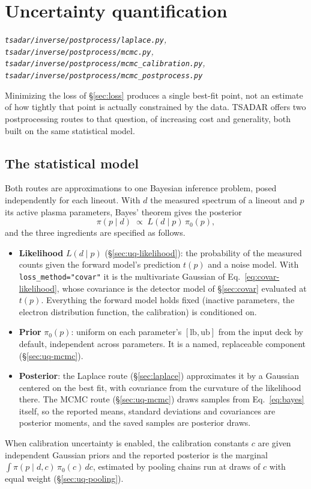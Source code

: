 \documentclass[11pt]{article}
\newcommand{\code}[1]{\texttt{#1}}
\newcommand{\file}[1]{\texttt{#1}}
\begin{document}
\section{Uncertainty quantification}\label{sec:uq}
\textit{\file{tsadar/inverse/postprocess/laplace.py}, \file{tsadar/inverse/postprocess/mcmc.py},
\file{tsadar/inverse/postprocess/mcmc\_calibration.py}, \file{tsadar/inverse/postprocess/mcmc\_postprocess.py}}

Minimizing the loss of \S\ref{sec:loss} produces a single best-fit point, not an estimate
of how tightly that point is actually constrained by the data. TSADAR offers two
postprocessing routes to that question, of increasing cost and generality, both built on
the same statistical model.

\subsection{The statistical model}\label{sec:uq-model}

Both routes are approximations to one Bayesian inference problem, posed independently for
each lineout. With $d$ the measured spectrum of a lineout and $p$ its active plasma
parameters, Bayes' theorem gives the posterior
\begin{equation}\label{eq:bayes}
  \pi(p\mid d)\;\propto\;L(d\mid p)\,\pi_0(p),
\end{equation}
and the three ingredients are specified as follows.
\begin{itemize}
  \item \textbf{Likelihood} $L(d\mid p)$ (\S\ref{sec:uq-likelihood}): the probability of
    the measured counts given the forward model's prediction $t(p)$ and a noise model. With
    \code{loss\_method="covar"} it is the multivariate Gaussian of
    Eq.~\ref{eq:covar-likelihood}, whose covariance is the detector model of
    \S\ref{sec:covar} evaluated at $t(p)$. Everything the forward model holds fixed
    (inactive parameters, the electron distribution function, the calibration) is
    conditioned on.
  \item \textbf{Prior} $\pi_0(p)$: uniform on each parameter's $[\mathrm{lb},\mathrm{ub}]$
    from the input deck by default, independent across parameters. It is a named,
    replaceable component (\S\ref{sec:uq-mcmc}).
  \item \textbf{Posterior}: the Laplace route (\S\ref{sec:laplace}) approximates it by a
    Gaussian centered on the best fit, with covariance from the curvature of the
    likelihood there. The MCMC route (\S\ref{sec:uq-mcmc}) draws samples from
    Eq.~\ref{eq:bayes} itself, so the reported means, standard deviations and covariances
    are posterior moments, and the saved samples are posterior draws.
\end{itemize}
When calibration uncertainty is enabled, the calibration constants $c$ are given
independent Gaussian priors and the reported posterior is the marginal
$\int\pi(p\mid d,c)\,\pi_0(c)\,dc$, estimated by pooling chains run at draws of $c$ with
equal weight (\S\ref{sec:uq-pooling}).
\end{document}
